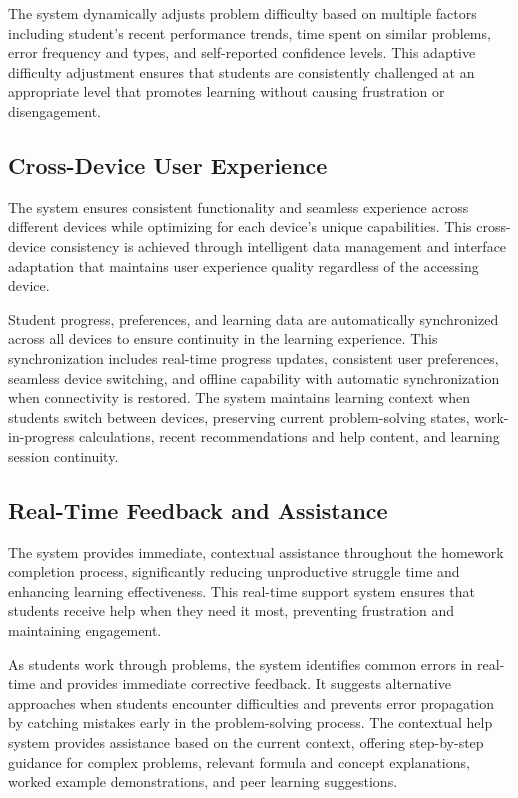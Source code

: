 \documentclass[conference]{IEEEtran}
\begin{document}
\begin{IEEEkeywords}
The system dynamically adjusts problem difficulty based on multiple factors including student's recent performance trends, time spent on similar problems, error frequency and types, and self-reported confidence levels. This adaptive difficulty adjustment ensures that students are consistently challenged at an appropriate level that promotes learning without causing frustration or disengagement.

\subsection{Cross-Device User Experience}

The system ensures consistent functionality and seamless experience across different devices while optimizing for each device's unique capabilities. This cross-device consistency is achieved through intelligent data management and interface adaptation that maintains user experience quality regardless of the accessing device.

Student progress, preferences, and learning data are automatically synchronized across all devices to ensure continuity in the learning experience. This synchronization includes real-time progress updates, consistent user preferences, seamless device switching, and offline capability with automatic synchronization when connectivity is restored. The system maintains learning context when students switch between devices, preserving current problem-solving states, work-in-progress calculations, recent recommendations and help content, and learning session continuity.

\subsection{Real-Time Feedback and Assistance}

The system provides immediate, contextual assistance throughout the homework completion process, significantly reducing unproductive struggle time and enhancing learning effectiveness. This real-time support system ensures that students receive help when they need it most, preventing frustration and maintaining engagement.

As students work through problems, the system identifies common errors in real-time and provides immediate corrective feedback. It suggests alternative approaches when students encounter difficulties and prevents error propagation by catching mistakes early in the problem-solving process. The contextual help system provides assistance based on the current context, offering step-by-step guidance for complex problems, relevant formula and concept explanations, worked example demonstrations, and peer learning suggestions.


\end{IEEEkeywords}
\end{document}
